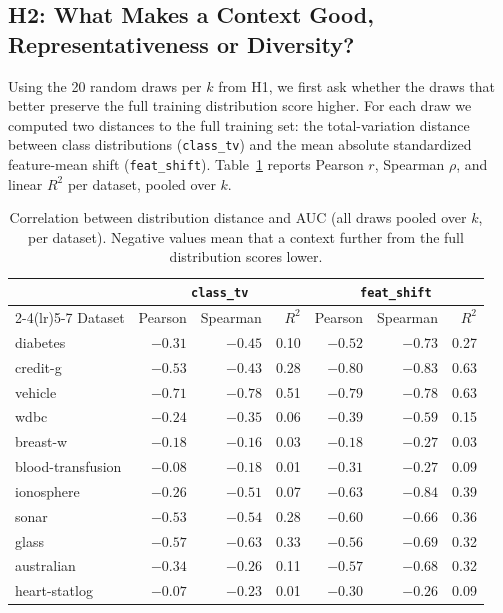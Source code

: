 \documentclass{article}
\begin{document}
\subsection{H2: What Makes a Context Good, Representativeness or Diversity?}

Using the 20 random draws per $k$ from H1, we first ask whether the draws that better preserve the full training distribution score higher. For each draw we computed two distances to the full training set: the total-variation distance between class distributions (\texttt{class\_tv}) and the mean absolute standardized feature-mean shift (\texttt{feat\_shift}). Table~\ref{tab:repr} reports Pearson $r$, Spearman $\rho$, and linear $R^2$ per dataset, pooled over $k$.

\begin{table}[h]
\centering
\caption{Correlation between distribution distance and AUC (all draws pooled over $k$, per dataset). Negative values mean that a context further from the full distribution scores lower.}
\label{tab:repr}
\begin{tabular}{lrrrrrr}
\toprule
& \multicolumn{3}{c}{\texttt{class\_tv}} & \multicolumn{3}{c}{\texttt{feat\_shift}} \\
\cmidrule(lr){2-4}\cmidrule(lr){5-7}
Dataset & Pearson & Spearman & $R^2$ & Pearson & Spearman & $R^2$ \\
\midrule
diabetes           & $-0.31$ & $-0.45$ & 0.10 & $-0.52$ & $-0.73$ & 0.27 \\
credit-g           & $-0.53$ & $-0.43$ & 0.28 & $-0.80$ & $-0.83$ & 0.63 \\
vehicle            & $-0.71$ & $-0.78$ & 0.51 & $-0.79$ & $-0.78$ & 0.63 \\
wdbc               & $-0.24$ & $-0.35$ & 0.06 & $-0.39$ & $-0.59$ & 0.15 \\
breast-w           & $-0.18$ & $-0.16$ & 0.03 & $-0.18$ & $-0.27$ & 0.03 \\
blood-transfusion  & $-0.08$ & $-0.18$ & 0.01 & $-0.31$ & $-0.27$ & 0.09 \\
ionosphere         & $-0.26$ & $-0.51$ & 0.07 & $-0.63$ & $-0.84$ & 0.39 \\
sonar              & $-0.53$ & $-0.54$ & 0.28 & $-0.60$ & $-0.66$ & 0.36 \\
glass              & $-0.57$ & $-0.63$ & 0.33 & $-0.56$ & $-0.69$ & 0.32 \\
australian         & $-0.34$ & $-0.26$ & 0.11 & $-0.57$ & $-0.68$ & 0.32 \\
heart-statlog      & $-0.07$ & $-0.23$ & 0.01 & $-0.30$ & $-0.26$ & 0.09 \\

\end{tabular}
\end{table}
\end{document}
